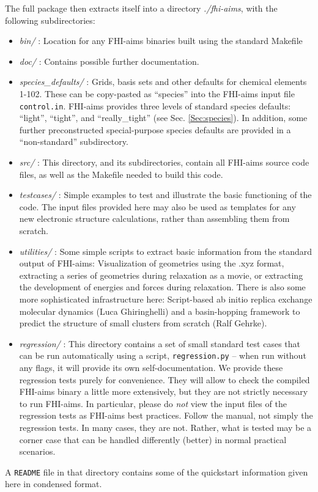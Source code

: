 The full package then extracts itself into a directory \emph{./fhi-aims}, with the
following subdirectories:
\begin{itemize}
  \item \emph{bin/} : Location for any FHI-aims binaries built using the
    standard Makefile
  \item \emph{doc/} : Contains possible further documentation.
  \item \emph{species\_defaults/} : Grids, basis sets and other defaults for
    chemical elements 1-102. These can be copy-pasted as ``species'' into the
    FHI-aims input file \texttt{control.in}. FHI-aims provides three levels of
    standard species defaults: ``light'', ``tight'',
    and ``really\_tight'' (see Sec. \ref{Sec:species}). In addition,
    some further preconstructed special-purpose species defaults are
    provided in a ``non-standard'' subdirectory.
  \item \emph{src/} : This directory, and its subdirectories, contain all FHI-aims source
    code files, as well as the Makefile needed to build this code. 
  \item \emph{testcases/} : Simple examples to test and illustrate the basic
    functioning of the code. The input files provided here may also be used as
    templates for any new electronic structure calculations, rather than
    assembling them from scratch.
  \item \emph{utilities/} : Some simple scripts to extract basic
    information from the standard output of FHI-aims:
    Visualization of geometries using the .xyz format, extracting a
    series of geometries during relaxation as a movie, or extracting
    the development of energies and forces during relaxation. There is
    also some more sophisticated infrastructure here: Script-based
    ab initio replica exchange molecular dynamics (Luca Ghiringhelli)
    and a basin-hopping framework to predict the structure of small
    clusters from scratch (Ralf Gehrke).
  \item \emph{regression/} : This directory contains a set of small standard
    test cases that can be run automatically using a script, \texttt{regression.py} --
    when run without any flags, it will provide its own self-documentation.
    We provide these regression tests purely for convenience. They
    will allow to check the compiled FHI-aims binary a little more
    extensively, but they are not strictly necessary to run
    FHI-aims. In particular, please do \emph{not} view the input files
    of the regression tests as FHI-aims best practices. Follow the
    manual, not simply the regression tests. In many cases,
    they are not. Rather, what is tested may be a corner case that can
    be handled differently (better) in normal practical scenarios.
\end{itemize}
A \texttt{README} file in that directory contains some of the quickstart information
given here in condensed format. 

